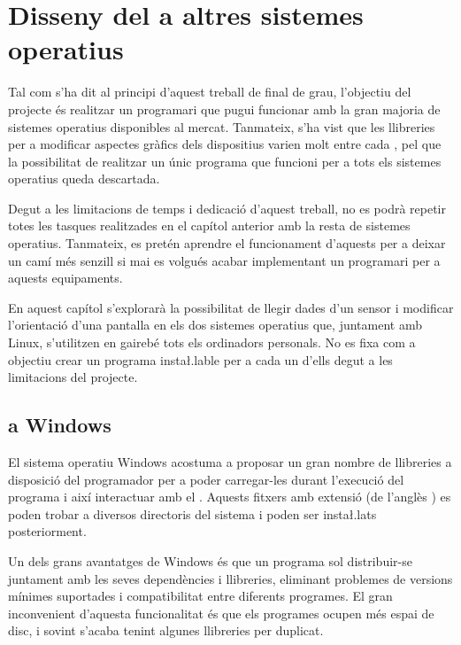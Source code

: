 \chapter{Disseny del  a altres sistemes operatius}
\label{cap:software-other}

Tal com s'ha dit al principi d'aquest treball de final de grau, l'objectiu
del projecte és realitzar un programari que pugui funcionar amb la gran majoria
de sistemes operatius disponibles al mercat. Tanmateix, s'ha vist que les
llibreries per a modificar aspectes gràfics dels dispositius varien molt entre
cada , pel que la possibilitat de realitzar un únic programa que
funcioni per a tots els sistemes operatius queda descartada.

Degut a les limitacions de temps i dedicació d'aquest treball, no es podrà
repetir totes les tasques realitzades en el capítol anterior amb la resta
de sistemes operatius. Tanmateix, es pretén aprendre el funcionament d'aquests
per a deixar un camí més senzill si mai es volgués acabar implementant un
programari per a aquests equipaments.

En aquest capítol s'explorarà la possibilitat de llegir dades d'un sensor
 i modificar l'orientació d'una pantalla en els dos sistemes operatius
que, juntament amb Linux, s'utilitzen en gairebé tots els ordinadors personals.
No es fixa com a objectiu crear un programa insta\l.lable per a cada un d'ells
degut a les limitacions del projecte.

\section{ a Windows}

El sistema operatiu Windows acostuma a proposar un gran nombre de llibreries
a disposició del programador per a poder carregar-les durant l'execució del
programa i així interactuar amb el . Aquests fitxers amb
extensió  (de l'anglès ) es poden trobar
a diversos directoris del sistema i poden ser insta\l.lats posteriorment.

Un dels grans avantatges de Windows és que un programa sol distribuir-se
juntament amb les seves dependències i llibreries, eliminant problemes de
versions mínimes suportades i compatibilitat entre diferents programes. El
gran inconvenient d'aquesta funcionalitat és que els programes ocupen més espai
de disc, i sovint s'acaba tenint algunes llibreries per duplicat.

